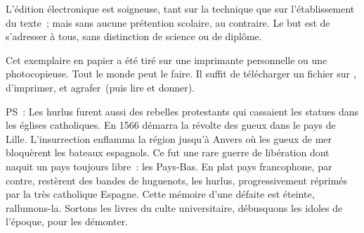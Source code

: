 \documentclass[twoside]{book} %
\begin{document}
  L’édition électronique est soigneuse, tant sur la technique
  que sur l’établissement du texte ; mais sans aucune prétention scolaire, au contraire.
  Le but est de s’adresser à tous, sans distinction de science ou de diplôme.
  \par

  Cet exemplaire en papier a été tiré sur une imprimante personnelle
   ou une photocopieuse. Tout le monde peut le faire.
  Il suffit de
  télécharger un fichier sur \href{https://hurlus.fr}{},
  d’imprimer, et agrafer (puis lire et donner).\par

  \bigskip

  \noindent PS : Les hurlus furent aussi des rebelles protestants qui cassaient les statues dans les églises catholiques. En 1566 démarra la révolte des gueux dans le pays de Lille. L’insurrection enflamma la région jusqu’à Anvers où les gueux de mer bloquèrent les bateaux espagnols.
  Ce fut une rare guerre de libération dont naquit un pays toujours libre : les Pays-Bas.
  En plat pays francophone, par contre, restèrent des bandes de huguenots, les hurlus, progressivement réprimés par la très catholique Espagne.
  Cette mémoire d’une défaite est éteinte, rallumons-la. Sortons les livres du culte universitaire, débusquons les idoles de l’époque, pour les démonter.
\fi
\end{document}
